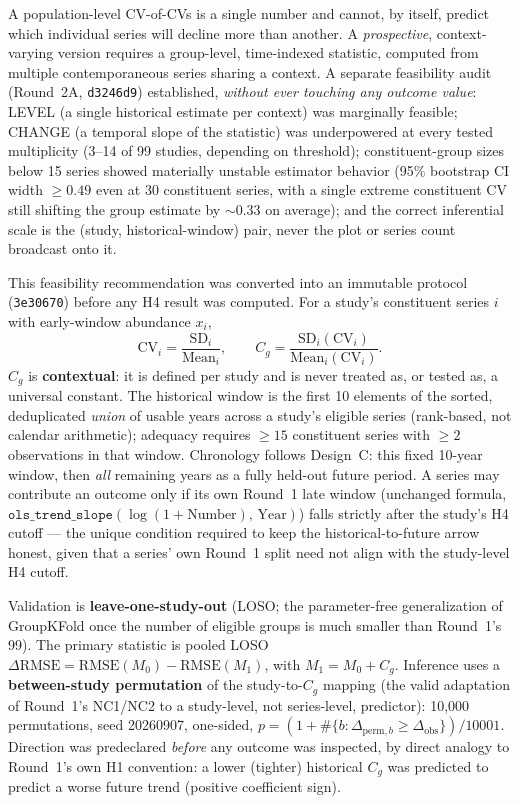 \documentclass[11pt]{article}
\newcommand{\Cg}{C_g}
\newcommand{\dRMSE}{\Delta\mathrm{RMSE}}
\begin{document}
A population-level CV-of-CVs is a single number and cannot, by itself,
predict which individual series will decline more than another. A
\emph{prospective}, context-varying version requires a group-level,
time-indexed statistic, computed from multiple contemporaneous series
sharing a context. A separate feasibility audit (Round~2A, \texttt{d3246d9})
established, \emph{without ever touching any outcome value}: LEVEL
(a single historical estimate per context) was marginally feasible;
CHANGE (a temporal slope of the statistic) was underpowered at every
tested multiplicity (3--14 of 99 studies, depending on threshold);
constituent-group sizes below 15 series showed materially unstable
estimator behavior (95\% bootstrap CI width $\geq 0.49$ even at 30
constituent series, with a single extreme constituent CV still shifting
the group estimate by $\sim$0.33 on average); and the correct inferential
scale is the (study, historical-window) pair, never the plot or series
count broadcast onto it.

This feasibility recommendation was converted into an immutable protocol
(\texttt{3e30670}) before any H4 result was computed. For a study's
constituent series $i$ with early-window abundance $x_i$,
\[
\mathrm{CV}_i = \frac{\mathrm{SD}_i}{\mathrm{Mean}_i}, \qquad
\Cg = \frac{\mathrm{SD}_i(\mathrm{CV}_i)}{\mathrm{Mean}_i(\mathrm{CV}_i)}.
\]
$\Cg$ is \textbf{contextual}: it is defined per study and is never
treated as, or tested as, a universal constant. The historical window is
the first 10 elements of the sorted, deduplicated \emph{union} of usable
years across a study's eligible series (rank-based, not calendar
arithmetic); adequacy requires $\geq 15$ constituent series with $\geq 2$
observations in that window. Chronology follows Design~C: this fixed
10-year window, then \emph{all} remaining years as a fully held-out
future period. A series may contribute an outcome only if its own
Round~1 late window (unchanged formula,
$\texttt{ols\_trend\_slope}(\log(1+\mathrm{Number}),\,\mathrm{Year})$)
falls strictly after the study's H4 cutoff --- the unique condition
required to keep the historical-to-future arrow honest, given that a
series' own Round~1 split need not align with the study-level H4 cutoff.

Validation is \textbf{leave-one-study-out} (LOSO; the parameter-free
generalization of GroupKFold once the number of eligible groups is much
smaller than Round~1's 99). The primary statistic is pooled LOSO
$\dRMSE = \mathrm{RMSE}(M_0)-\mathrm{RMSE}(M_1)$, with $M_1 = M_0 + \Cg$.
Inference uses a \textbf{between-study permutation} of the
study-to-$\Cg$ mapping (the valid adaptation of Round~1's NC1/NC2 to a
study-level, not series-level, predictor): 10{,}000 permutations, seed
20260907, one-sided, $p=(1+\#\{b:\Delta_{\mathrm{perm},b}\geq
\Delta_{\mathrm{obs}}\})/10001$. Direction was predeclared \emph{before}
any outcome was inspected, by direct analogy to Round~1's own H1
convention: a lower (tighter) historical $\Cg$ was predicted to predict a
worse future trend (positive coefficient sign).
\end{document}
